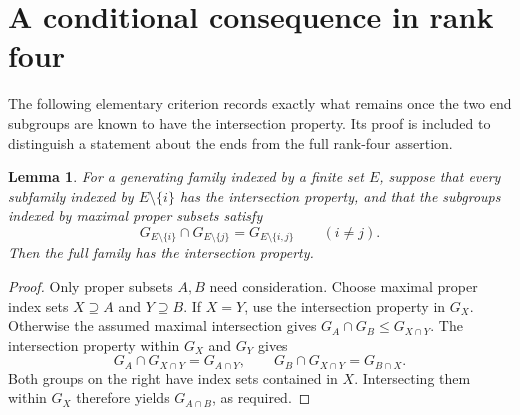 \documentclass[11pt]{article}
\newtheorem{lemma}[theorem]{Lemma}
\theoremstyle{definition}\newtheorem{definition}[theorem]{Definition}
\begin{document}
\section*{A conditional consequence in rank four}

The following elementary criterion records exactly what remains once the
two end subgroups are known to have the intersection property.  Its proof
is included to distinguish a statement about the ends from the full
rank-four assertion.

\begin{lemma}\label{lem:maximal}
For a generating family indexed by a finite set $E$, suppose that every
subfamily indexed by $E\setminus\{i\}$ has the intersection property,
and that the subgroups indexed by maximal proper subsets satisfy
\[
 G_{E\setminus\{i\}}\cap G_{E\setminus\{j\}}
                    =G_{E\setminus\{i,j\}}\qquad(i\ne j).
\]
Then the full family has the intersection property.
\end{lemma}
\begin{proof}
Only proper subsets $A,B$ need consideration.  Choose maximal proper
index sets $X\supseteq A$ and $Y\supseteq B$.  If $X=Y$, use the
intersection property in $G_X$.  Otherwise the assumed maximal
intersection gives $G_A\cap G_B\le G_{X\cap Y}$.
The intersection property within $G_X$ and $G_Y$ gives
\[
 G_A\cap G_{X\cap Y}=G_{A\cap Y},\qquad
 G_B\cap G_{X\cap Y}=G_{B\cap X}.
\]
Both groups on the right have index sets contained in $X$.
Intersecting them within $G_X$ therefore yields $G_{A\cap B}$,
as required.
\end{proof}
\end{document}

